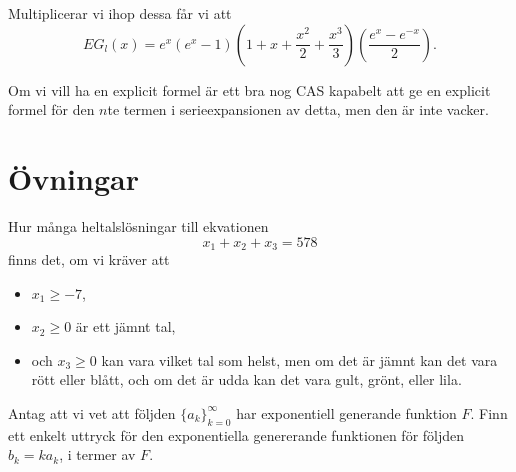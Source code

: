 \documentclass[nobib]{tufte-handout}
\begin{document}
\begin{example}
  Multiplicerar vi ihop dessa får vi att 
  $$EG_l(x) = e^x\left(e^x - 1\right)\left(1 + x + \frac{x^2}{2} + \frac{x^3}{3}\right)\left(\frac{e^x - e^{-x}}{2}\right).$$
  
  Om vi vill ha en explicit formel är ett bra nog CAS kapabelt att ge en explicit formel för den $n$te termen i serieexpansionen av detta, men den är inte vacker.
\end{example}

\section{Övningar}

\begin{xca}
  Hur många heltalslösningar till ekvationen
  $$x_1 + x_2 + x_3 = 578$$
  finns det, om vi kräver att
  \begin{itemize}
    \item $x_1 \geq -7$,
    \item $x_2 \geq 0$ är ett jämnt tal,
    \item och $x_3 \geq 0$ kan vara vilket tal som helst, men om det är jämnt kan det vara rött eller blått, och om det är udda kan det vara gult, grönt, eller lila. 
  \end{itemize}
\end{xca}

\begin{xca}
  Antag att vi vet att följden $\{a_k\}_{k=0}^\infty$ har exponentiell generande funktion $F$. Finn ett enkelt uttryck för den exponentiella genererande funktionen för följden $b_k = k a_k$, i termer av $F$.
\end{xca}
\end{document}
